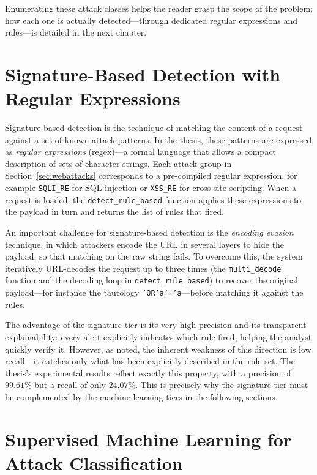 Enumerating these attack classes helps the reader grasp the scope of the
problem; how each one is actually detected---through dedicated regular
expressions and rules---is detailed in the next chapter.

\section{Signature-Based Detection with Regular Expressions}
\label{sec:signature}

Signature-based detection is the technique of matching the content of a
request against a set of known attack patterns. In the thesis, these
patterns are expressed as \emph{regular expressions} (regex)---a formal
language that allows a compact description of sets of character strings.
Each attack group in Section~\ref{sec:webattacks} corresponds to a
pre-compiled regular expression, for example \texttt{SQLI\_RE} for SQL
injection or \texttt{XSS\_RE} for cross-site scripting. When a request is
loaded, the \texttt{detect\_rule\_based} function applies these expressions
to the payload in turn and returns the list of rules that fired.

An important challenge for signature-based detection is the \emph{encoding
evasion} technique, in which attackers encode the URL in several layers to
hide the payload, so that matching on the raw string fails. To overcome
this, the system iteratively URL-decodes the request up to three times (the
\texttt{multi\_decode} function and the decoding loop in
\texttt{detect\_rule\_based}) to recover the original payload---for
instance the tautology \texttt{'OR'a'='a}---before matching it against the
rules.

The advantage of the signature tier is its very high precision and its
transparent explainability: every alert explicitly indicates which rule
fired, helping the analyst quickly verify it. However, as noted, the
inherent weakness of this direction is low recall---it catches only what
has been explicitly described in the rule set. The thesis's experimental
results reflect exactly this property, with a precision of $99.61\%$ but a
recall of only $24.07\%$. This is precisely why the signature tier must be
complemented by the machine learning tiers in the following sections.

\section{Supervised Machine Learning for Attack Classification}
\label{sec:sup}

